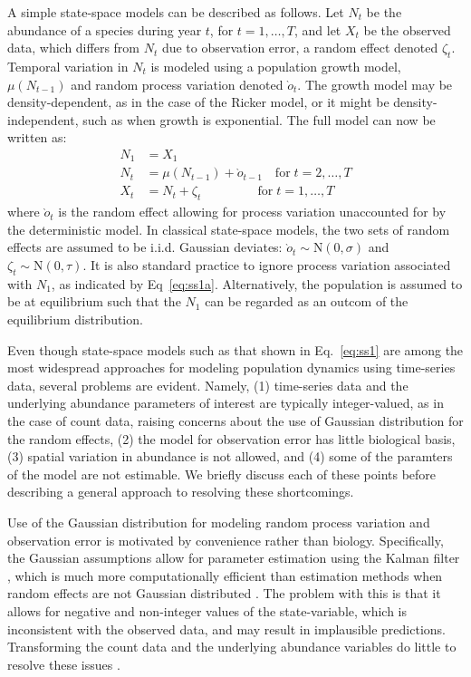 \documentclass[12pt]{article}
\begin{document}
A simple state-space models can be described as follows.
Let $N_t$ be the abundance of a species during year $t$, for
$t=1,\hdots,T$, and let $X_t$ be
the observed data, which differs from $N_t$ due to observation error,
a random effect denoted $\zeta_t$. Temporal variation in $N_t$ is
modeled using a population growth model, $\mu(N_{t-1})$
and random process variation denoted $\grave{o}_t$.
The growth model may be density-dependent, as in the case of the
Ricker model, or it might be density-independent, such as when growth
is exponential.
The full model can now be written as:
\begin{subequations}
  \label{eq:ss1}
  \begin{align}
    N_1 &= X_1 \label{eq:ss1a} \\
    N_t &= \mu(N_{t-1}) + \grave{o}_{t-1} \quad \text{for} \; t=2,\hdots,T \label{eq:ss1b} \\
    X_t &= N_t + \zeta_t \qquad \qquad \;\, \text{for} \; t=1,\hdots,T \label{eq:ss1c}
  \end{align}
\end{subequations}
where $\grave{o}_t$ is the random effect allowing for process
variation unaccounted for by the deterministic model. In classical
state-space models, the two sets of random effects
are assumed to be i.i.d. Gaussian deviates:
$\grave{o}_t \sim \mathrm{N}(0, \sigma)$ and
$\zeta_t \sim \mathrm{N}(0, \tau)$. It is also standard practice to
ignore process variation associated with $N_1$, as
indicated by Eq~\ref{eq:ss1a}. Alternatively, the population is
assumed to be at equilibrium such that the $N_1$ can be regarded as an
outcom of the equilibrium distribution.

Even though state-space models such as that shown in Eq.~\ref{eq:ss1}
are among the most widespread approaches for modeling population dynamics
using time-series data, several problems are evident. Namely, (1)
time-series data and the underlying abundance parameters of interest
are typically integer-valued, as in the case of count data, raising
concerns about the use of Gaussian distribution for the random
effects, (2) the model for observation error has little biological basis, (3)
spatial variation in abundance is not allowed, and (4) some of the
paramters of the model are not estimable. We briefly discuss each of
these points before describing a general approach to resolving these
shortcomings.

Use of the Gaussian distribution for modeling random process variation
and observation error is motivated by convenience rather than
biology. Specifically, the Gaussian assumptions
allow for parameter estimation using the Kalman filter
\citep{dennis_etal:2006}, which is much more computationally efficient
than estimation methods when random effects are not Gaussian distributed
\citep{devalpine_hastings:2002}. The problem with this is that it
allows for negative and non-integer values of the state-variable, which is
inconsistent with the observed data, and may result in implausible predictions.
Transforming the count data and the underlying abundance variables do
little to resolve these issues \citep{ohara_kotze:2010}.
\end{document}
